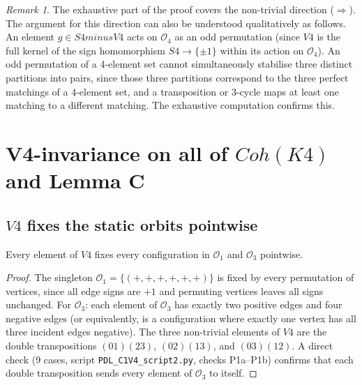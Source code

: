 \documentclass[11pt,a4paper]{article}
\def\Sfour{S4}%
\def\Vfour{V4}%
\def\Kfour{K4}%
\def\setminus{ minus }%
\def\mathrm#1{#1}%
\newenvironment{lemmabox}[1][]{%
  \begin{tcolorbox}[lemmastyle,title={Lemma\ifx\relax#1\relax\else: #1\fi}]}
  {\end{tcolorbox}}
\theoremstyle{plain}
\theoremstyle{definition}
\theoremstyle{remark}
\newtheorem{remark}[theorem]{Remark}
\newcommand{\Kfour}{K_4}
\newcommand{\Sfour}{S_4}
\newcommand{\Vfour}{V_4}
\newcommand{\Coh}{\mathrm{Coh}}
\newcommand{\Orb}[1]{\mathcal{O}_{#1}}
\begin{document}
\begin{remark}
The exhaustive part of the proof covers the non-trivial direction ($\Rightarrow$). The
argument for this direction can also be understood qualitatively as follows. An element
$g \in \Sfour \setminus \Vfour$ acts on $\Orb{4}$ as an odd permutation (since $\Vfour$
is the full kernel of the sign homomorphism $\Sfour \to \{\pm 1\}$ within its action on
$\Orb{4}$). An odd permutation of a 4-element set cannot simultaneously stabilise three
distinct partitions into pairs, since those three partitions correspond to the three
perfect matchings of a 4-element set, and a transposition or 3-cycle maps at least one
matching to a different matching. The exhaustive computation confirms this.
\end{remark}

\section{V4-invariance on all of \texorpdfstring{$\Coh(\Kfour)$}{Coh(K4)} and Lemma C}
\label{sec:lemmaC}

\subsection{\texorpdfstring{$\Vfour$}{V4} fixes the static orbits pointwise}

\begin{lemmabox}[$\Vfour$ acts trivially on $\Orb{1}$ and $\Orb{3}$]
\label{lem:static}
Every element of $\Vfour$ fixes every configuration in $\Orb{1}$ and $\Orb{3}$ pointwise.
\end{lemmabox}

\begin{proof}
The singleton $\Orb{1} = \{(+,+,+,+,+,+)\}$ is fixed by every permutation of vertices,
since all edge signs are $+1$ and permuting vertices leaves all signs unchanged. For
$\Orb{3}$: each element of $\Orb{3}$ has exactly two positive edges and four negative edges
(or equivalently, is a configuration where exactly one vertex has all three incident edges
negative). The three non-trivial elements of $\Vfour$ are the double transpositions
$(01)(23)$, $(02)(13)$, and $(03)(12)$. A direct check (9 cases, script
\texttt{PDL\_C1V4\_script2.py}, checks P1a--P1b) confirms that each double transposition
sends every element of $\Orb{3}$ to itself.
\end{proof}
\end{document}
